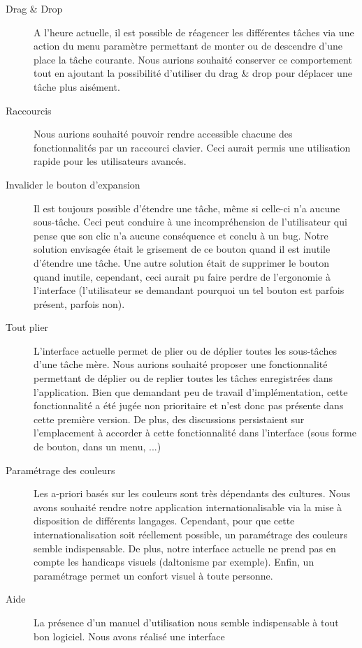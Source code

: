 \documentclass[11pt]{article}
\begin{document}
\begin{description}
\item[Drag \& Drop] A l'heure actuelle, il est possible de réagencer
  les différentes tâches via une action du menu paramètre permettant
  de monter ou de descendre d'une place la tâche courante. Nous
  aurions souhaité conserver ce comportement tout en ajoutant la
  possibilité d'utiliser du drag \& drop pour déplacer une tâche plus
  aisément.
\item[Raccourcis] Nous aurions souhaité pouvoir rendre accessible
  chacune des fonctionnalités par un raccourci clavier. Ceci aurait
  permis une utilisation rapide pour les utilisateurs avancés.
\item[Invalider le bouton d'expansion] Il est toujours possible
  d'étendre une tâche, même si celle-ci n'a aucune sous-tâche. Ceci
  peut conduire à une incompréhension de l'utilisateur qui pense que
  son clic n'a aucune conséquence et conclu à un bug. Notre solution
  envisagée était le grisement de ce bouton quand il est inutile
  d'étendre une tâche. Une autre solution était de supprimer le bouton
  quand inutile, cependant, ceci aurait pu faire perdre de l'ergonomie
  à l'interface (l'utilisateur se demandant pourquoi un tel bouton est
  parfois présent, parfois non).
\item[Tout plier] L'interface actuelle permet de plier ou de déplier
  toutes les sous-tâches d'une tâche mère. Nous aurions souhaité
  proposer une fonctionnalité permettant de déplier ou de replier
  toutes les tâches enregistrées dans l'application. Bien que
  demandant peu de travail d'implémentation, cette fonctionnalité a
  été jugée non prioritaire et n'est donc pas présente dans cette
  première version. De plus, des discussions persistaient sur
  l'emplacement à accorder à cette fonctionnalité dans l'interface
  (sous forme de bouton, dans un menu, ...)
\item[Paramétrage des couleurs] Les a-priori basés sur les couleurs
  sont très dépendants des cultures. Nous avons souhaité rendre notre
  application internationalisable via la mise à disposition de
  différents langages. Cependant, pour que cette internationalisation
  soit réellement possible, un paramétrage des couleurs semble
  indispensable. De plus, notre interface actuelle ne prend pas en
  compte les handicaps visuels (daltonisme par exemple). Enfin, un
  paramétrage permet un confort visuel à toute personne.
\item[Aide] La présence d'un manuel d'utilisation nous semble
  indispensable à tout bon logiciel. Nous avons réalisé une interface

\end{description}
\end{document}
